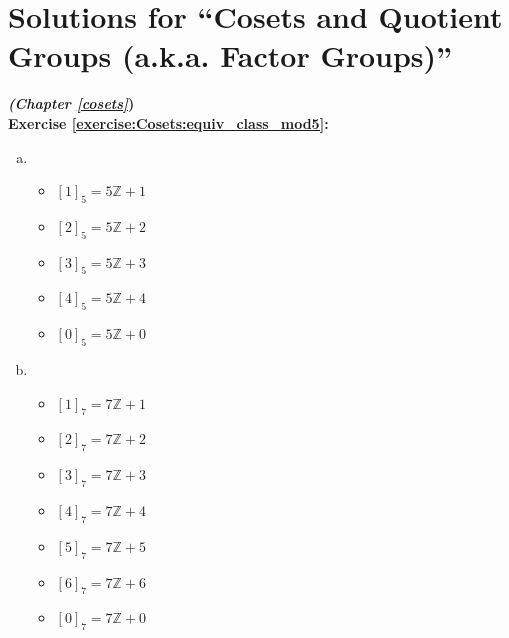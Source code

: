 
\section{Solutions for ``Cosets and Quotient Groups (a.k.a. Factor Groups)''}
\noindent\textbf{\textit{(Chapter \ref{cosets}})}\bigskip
\\
\textbf{Exercise \ref{exercise:Cosets:equiv_class_mod5}:}
\begin{multicols}{2}
\begin{enumerate}[(a)]
\item
	\begin{itemize}
	\item
	$[1]_5 = 5{\mathbb Z} + 1$
	\item
	$[2]_5 = 5{\mathbb Z} + 2$
	\item
	$[3]_5 = 5{\mathbb Z} + 3$
	\item
	$[4]_5 = 5{\mathbb Z} + 4$
	\item
	$[0]_5 = 5{\mathbb Z} + 0$
	\end{itemize}
\columnbreak	
\item
	\begin{itemize}
	\item
	$[1]_7 = 7{\mathbb Z} + 1$
	\item
	$[2]_7 = 7{\mathbb Z} + 2$
	\item
	$[3]_7 = 7{\mathbb Z} + 3$
	\item
	$[4]_7 = 7{\mathbb Z} + 4$
	\item
	$[5]_7 = 7{\mathbb Z} + 5$
	\item
	$[6]_7 = 7{\mathbb Z} + 6$
	\item
	$[0]_7 = 7{\mathbb Z} + 0$
	\end{itemize}
\end{enumerate}
\end{multicols}

